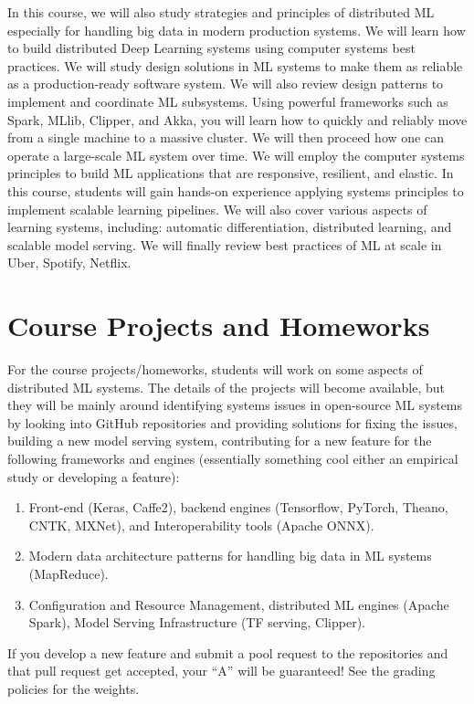 \documentclass[11pt]{article}
\begin{document}
In this course, we will also study strategies and principles of distributed ML especially for handling big data in modern production systems. We will learn how to build distributed Deep Learning systems using computer systems best practices. We will study design solutions in ML systems to make them as reliable as a production-ready software system. We will also review design patterns to implement and coordinate ML subsystems. Using powerful frameworks such as Spark, MLlib, Clipper, and Akka, you will learn how to quickly and reliably move from a single machine to a massive cluster. We will then proceed how one can operate a large-scale ML system over time. We will employ the computer systems principles to build ML applications that are responsive, resilient, and elastic. In this course, students will gain hands-on experience applying systems principles to implement scalable learning pipelines. We will also cover various aspects of learning systems, including: automatic differentiation, distributed learning, and scalable model serving. We will finally review best practices of ML at scale in Uber, Spotify, Netflix. 


\section*{Course Projects and Homeworks}

For the course projects/homeworks, students will work on some aspects of distributed ML systems. The details of the projects will become available, but they will be mainly around identifying systems issues in open-source ML systems by looking into GitHub repositories and providing solutions for fixing the issues, building a new model serving system, contributing for a new feature for the following frameworks and engines (essentially something cool either an empirical study or developing a feature):
\begin{enumerate}
\item Front-end (Keras, Caffe2), backend engines (Tensorflow, PyTorch, Theano, CNTK, MXNet), and Interoperability tools (Apache ONNX).
\item Modern data architecture patterns for handling big data in ML systems (MapReduce).
\item Configuration and Resource Management, distributed ML engines (Apache Spark), Model Serving Infrastructure (TF serving, Clipper).
\end{enumerate}

If you develop a new feature and submit a pool request to the repositories and that pull request get accepted, your ``A'' will be guaranteed! See the grading policies for the weights.
\end{document}
